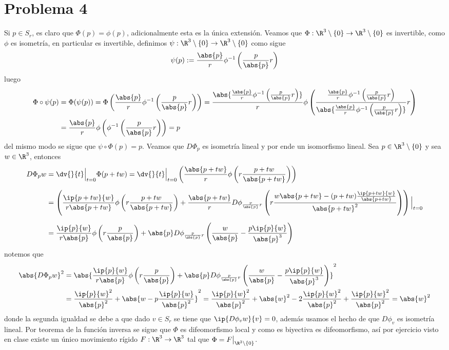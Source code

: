 \documentclass{article}
\begin{document}
\section*{Problema 4}
\noindent Si $p\in S_{r}$, es claro que $\Phi(p)=\phi(p)$, adicionalmente esta es la única 
extensión. Veamos que $\Phi:\R^{3}\setminus\{0\}\to\R^{3}\setminus\{0\}$ es invertible, 
como $\phi$ es isometría, en particular es invertible, definimos $\psi:\R^{3}\setminus\{0\}\to
\R^{3}\setminus\{0\}$ como sigue
\begin{equation*}
    \psi(p):=\frac{\abs{p}}{r}\phi^{-1}\left(\frac{p}{\abs{p}}r\right)
\end{equation*}
luego
\begin{align*}
    \Phi\circ\psi(p) &= \Phi(\psi(p))=\Phi\left(\frac{\abs{p}}{r}\phi^{-1}
    \left(\frac{p}{\abs{p}}r\right)\right)=\frac{\abs{\frac{\abs{p}}{r}\phi^{-1}\left(\frac{p}
    {\abs{p}}r\right)}}{r}\phi\left(\frac{\frac{\abs{p}}{r}\phi^{-1}\left(\frac{p}
    {\abs{p}}r\right)}{\abs{\frac{\abs{p}}{r}\phi^{-1}\left(\frac{p}{\abs{p}}r\right)}}r\right) \\
    &= \frac{\abs{p}}{r}\phi\left(\phi^{-1}\left(\frac{p}{\abs{p}}r\right)\right)=p
\end{align*}
del mismo modo se sigue que $\psi\circ\Phi(p)=p$. Veamos que $D\Phi_{p}$ es isometría lineal y por 
ende un isomorfismo lineal. Sea $p\in\R^{3}\setminus\{0\}$ y sea $w\in\R^{3}$, entonces
\begin{align*}
    D\Phi_{p}w &= \dv{}{t}\Big|_{t=0}\Phi(p+tw)=\dv{}{t}\Big|_{t=0}\left(\frac{\abs{p+tw}}{r}\phi
    \left(r\frac{p+tw}{\abs{p+tw}}\right)\right) \\[2mm]
    &= \left(\frac{\ip{p+tw}{w}}{r\abs{p+tw}}\phi\left(r\frac{p+tw}{\abs{p+tw}}\right)
    +\frac{\abs{p+tw}}{r}D\phi_{\frac{p}{\abs{p}}r}\left(r\frac{w\abs{p+tw}-(p+tw)
    \frac{\ip{p+tw}{w}}{\abs{p+tw}}}{\abs{p+tw}^{2}}\right)\right)\Big|_{t=0} \\[2mm]
    &= \frac{\ip{p}{w}}{r\abs{p}}\phi\left(r\frac{p}{\abs{p}}\right)+\abs{p}
    D\phi_{\frac{p}{\abs{p}}r}\left(\frac{w}{\abs{p}}-\frac{p\ip{p}{w}}{\abs{p}^{3}}\right)
\end{align*}
notemos que
\begin{align*}
    \abs{D\Phi_{p}w}^{2} &= \abs{\frac{\ip{p}{w}}{r\abs{p}}\phi\left(r\frac{p}{\abs{p}}\right)+
    \abs{p}D\phi_{\frac{p}{\abs{p}}r}\left(\frac{w}{\abs{p}}-\frac{p\ip{p}{w}}{\abs{p}^{3}}
    \right)}^{2} \\
    &= \frac{\ip{p}{w}^{2}}{\abs{p}^{2}}+\abs{w-p\frac{\ip{p}{w}}{\abs{p}^{2}}}^{2}
    =\frac{\ip{p}{w}^{2}}{\abs{p}^{2}}+\abs{w}^{2}-2\frac{\ip{p}{w}^{2}}{\abs{p}^{2}}
    +\frac{\ip{p}{w}^{2}}{\abs{p}^{2}}=\abs{w}^{2}
\end{align*}
donde la segunda igualdad se debe a que dado $v\in S_{r}$ se tiene que $\ip{D\phi_{v}w}{v}=0$, 
además usamos el hecho de que $D\phi_{v}$ es isometría lineal. Por teorema de la función inversa
se sigue que $\Phi$ es difeomorfismo local y como es biyectiva es difeomorfismo, así por ejercicio
visto en clase existe un único movimiento rígido $F:\R^{3}\to\R^{3}$ 
tal que $\Phi=F\big|_{\R^{3}\setminus\{0\}}$.
\end{document}
